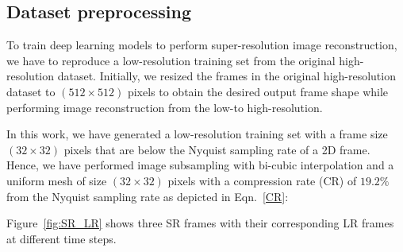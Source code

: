 \subsection{Dataset preprocessing}
To train deep learning models to perform super-resolution image reconstruction, we have to reproduce a low-resolution training set from the original high-resolution dataset. 
Initially, we resized the frames in the original high-resolution dataset to \((512\times512)\) pixels to obtain the desired output frame shape while performing image reconstruction from the low-to high-resolution.

In this work, we have generated a low-resolution training set with a frame size \((32\times32)\) pixels that are below the Nyquist sampling rate of a 2D frame.
Hence, we have performed image subsampling with bi-cubic interpolation and a uniform mesh of size \((32\times32)\) pixels with a compression rate (CR) of \(19.2\%\) from the Nyquist sampling rate as depicted in Eqn.~\ref{CR}:

Figure~\ref{fig:SR_LR} shows three SR frames with their corresponding LR frames at different time steps.

